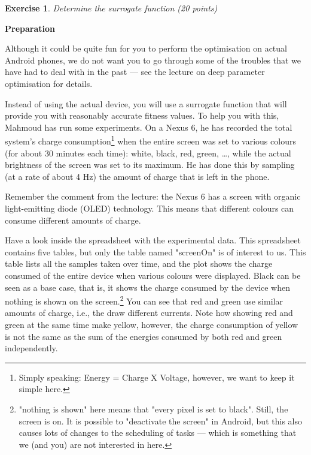 \documentclass{pracs}
\newtheorem{exercise}{Exercise}
\begin{document}

\begin{exercise}
Determine the surrogate function (20 points)
\end{exercise}

\textbf{Preparation}

Although it could be quite fun for you to perform the optimisation on actual Android phones, we do not want you to go through some of the troubles that we have had to deal with in the past --- see the lecture on deep parameter optimisation for details.

Instead of using the actual device, you will use a surrogate function that will provide you with reasonably accurate fitness values. To help you with this, Mahmoud has run some experiments. On a Nexus 6, he has recorded the total system's charge consumption\footnote{Simply speaking: Energy = Charge X Voltage, however, we want to keep it simple here.} when the entire screen was set to various colours (for about 30 minutes each time): white, black, red, green, \ldots, while the actual brightness of the screen was set to its maximum. He has done this by sampling (at a rate of about 4 Hz) the amount of charge that is left in the phone.

Remember the comment from the lecture: the Nexus 6 has a screen with organic light-emitting diode (OLED) technology. This means that different colours can consume different amounts of charge.

Have a look inside the spreadsheet with the experimental data. This spreadsheet contains five tables, but only the table named "screenOn" is of interest to us. This table lists all the samples taken over time, and the plot shows the charge consumed of the entire device when various colours were displayed. 
Black can be seen as a base case, that is, it shows the charge consumed by the device when nothing is shown on the screen.\footnote{"nothing is shown" here means that "every pixel is set to black". Still, the screen is on. It is possible to  "deactivate the screen" in Android, but this also causes lots of changes to the scheduling of tasks --- which is something that we (and you) are not interested in here.} 
You can see that red and green use similar amounts of charge, i.e., the draw different currents. Note how showing red and green at the same time make yellow, however, the charge consumption of yellow is not the same as the sum of the energies consumed by both red and green independently.
\end{document}
